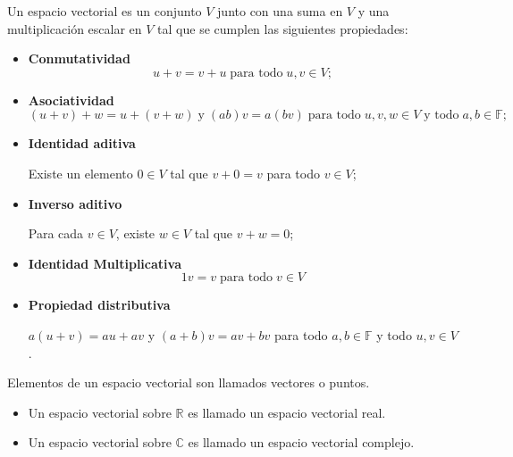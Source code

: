 \begin{tcolorbox}[colback=white]
    \begin{def.} Un espacio vectorial es un conjunto $V$ junto con una suma en $V$ y una multiplicación escalar en $V$ tal que se cumplen las siguientes propiedades: 
	\begin{itemize}
	    \item \textbf{Conmutatividad}
		$$u+v=v+u\; \mbox{para todo}\; u,v\in V;$$
	    \item \textbf{Asociatividad}
		$$(u+v)+w=u+(v+w)\; \mbox{y}\; (ab)v=a(bv)\; \mbox{para todo}\; u,v,w \in V\; \mbox{y todo}\; a,b\in \mathbb{F};$$
	    \item \textbf{Identidad aditiva}
		\begin{center}
		    Existe un elemento $0\in V$ tal que $v+0=v$ para todo $v\in V$;
		\end{center}

	    \item \textbf{Inverso aditivo}
		\begin{center}
		    Para cada $v\in V$, existe $w \in V$ tal que $v+w=0$;
		\end{center}

	    \item \textbf{Identidad Multiplicativa}
		$$1v=v\; \mbox{para todo}\; v\in V$$

	    \item \textbf{Propiedad distributiva}
		\begin{center}
		    $a(u+v)=au+av$ y $(a+b)v=av+bv$ para todo $a,b\in \mathbb{F}$ y todo $u,v \in V$.
		\end{center}
	\end{itemize}
    \end{def.}
\end{tcolorbox}

\begin{tcolorbox}[colback=white]
    \begin{def.}
	Elementos de un espacio vectorial son llamados vectores o puntos.
    \end{def.}
\end{tcolorbox}

\begin{tcolorbox}[colback=white]
    \begin{def.}\hfill
	\begin{itemize}
	    \item Un espacio vectorial sobre $\mathbb{R}$ es llamado un espacio vectorial real.
	    \item Un espacio vectorial sobre $\mathbb{C}$ es llamado un espacio vectorial complejo.
	\end{itemize}
    \end{def.}
\end{tcolorbox}



